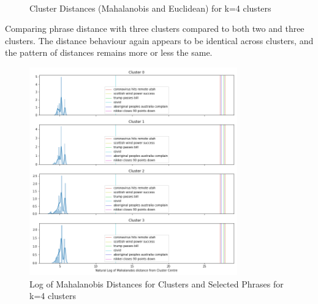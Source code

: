 \begin{figure}[H]
	\centering
	\\
	
	\caption{Cluster Distances (Mahalanobis and Euclidean) for k=4 clusters}
	\label{fig:distk4}
\end{figure}

Comparing phrase distance with three clusters compared to both two and three clusters. The distance behaviour again appears to be identical across clusters, and the pattern of distances remains more or less the same. 
\begin{figure}[H]
	\centering
	\includegraphics[width=0.8\textwidth]{images/words_kmeans_mahalanobis_distance_k=4.png}
	\caption{Log of Mahalanobis Distances for Clusters and Selected Phrases for k=4 clusters}
	\label{fig:wordsk4}
\end{figure}
